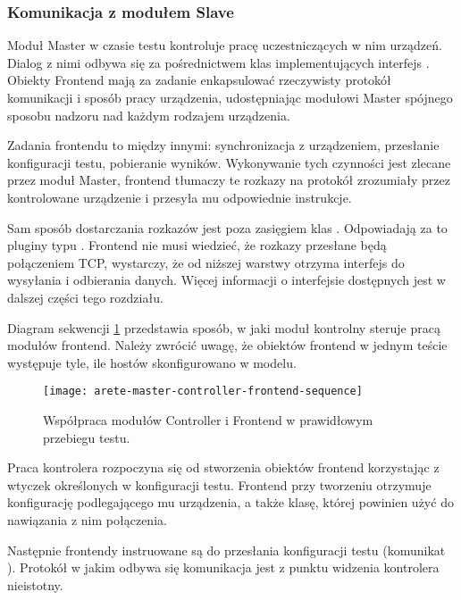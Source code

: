 \documentclass[00-praca-magisterska.tex]{subfiles}
\begin{document}
\subsubsection{Komunikacja z modułem Slave}

Moduł Master w czasie testu kontroluje pracę uczestniczących w nim urządzeń.
Dialog z nimi odbywa się za pośrednictwem klas implementujących interfejs
. Obiekty Frontend mają za zadanie enkapsulować rzeczywisty
protokół komunikacji i sposób pracy urządzenia, udostępniając modułowi Master
spójnego sposobu nadzoru nad każdym rodzajem urządzenia.

Zadania frontendu to między innymi: synchronizacja z urządzeniem, przesłanie
konfiguracji testu, pobieranie wyników. Wykonywanie tych czynności jest zlecane
przez moduł Master, frontend tłumaczy te rozkazy na protokół zrozumiały przez
kontrolowane urządzenie i przesyła mu odpowiednie instrukcje.

Sam sposób dostarczania rozkazów jest poza zasięgiem klas .
Odpowiadają za to pluginy typu . Frontend nie musi
wiedzieć, że rozkazy przesłane będą połączeniem TCP, wystarczy, że od niższej
warstwy otrzyma interfejs do wysyłania i odbierania danych. Więcej informacji o
interfejsie  dostępnych jest w dalszej części tego
rozdziału.

Diagram sekwencji \ref{fig:arete-master-controller-frontend-sequence}
przedstawia sposób, w jaki moduł kontrolny steruje pracą modułów frontend.
Należy zwrócić uwagę, że obiektów frontend w jednym teście występuje tyle, ile
hostów skonfigurowano w modelu.

\begin{figure}[htb]
\begin{center}
\leavevmode
\texttt{[image: arete-master-controller-frontend-sequence]}
\end{center}
\caption{Współpraca modułów Controller i Frontend w prawidłowym przebiegu testu.}
\label{fig:arete-master-controller-frontend-sequence}
\end{figure}

Praca kontrolera rozpoczyna się od stworzenia obiektów frontend korzystając z
wtyczek określonych w konfiguracji testu. Frontend przy tworzeniu otrzymuje
konfigurację podlegającego mu urządzenia, a także klasę, której powinien użyć
do nawiązania z nim połączenia.

Następnie frontendy instruowane są do przesłania konfiguracji testu (komunikat
). Protokół w jakim odbywa się komunikacja jest z
punktu widzenia kontrolera nieistotny.
\end{document}
